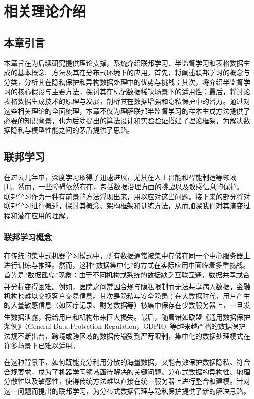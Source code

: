 \chapter{相关理论介绍}
\thispagestyle{others}
\pagestyle{others}
\xiaosi

\section{本章引言}
本章旨在为后续研究提供理论支撑，系统介绍联邦学习、半监督学习和表格数据生成的基本概念、方法及其在分布式环境下的应用。首先，将阐述联邦学习的概念与分类，分析其在隐私保护和异构数据处理中的优势与挑战；其次，将介绍半监督学习的核心假设与主要方法，探讨其在标记数据稀缺场景下的适用性；最后，将讨论表格数据生成技术的原理与发展，剖析其在数据增强和隐私保护中的潜力。通过对这些相关理论的全面梳理，本章不仅为理解联邦半监督学习的样本生成方法提供了必要的知识背景，也为后续提出的算法设计和实验验证搭建了理论框架，为解决数据隐私与模型性能之间的矛盾提供了思路。

\section{联邦学习}
在过去几年中，深度学习取得了迅速进展，尤其在人工智能和智能制造等领域[1]。然而，一些障碍依然存在，包括数据治理方面的挑战以及敏感信息的保护。联邦学习作为一种有前景的方法浮现出来，用以应对这些问题。接下来的部分将对联邦学习进行概述，探讨其概念、架构框架和训练方法，从而加深我们对其演变过程和潜在应用的理解。
\subsection{联邦学习概念}
在传统的集中式机器学习模式中，所有数据通常被集中存储在同一个中心服务器上进行训练与推理。然而，这种“数据集中化”的方式在实际应用中面临着多重挑战。首先是“数据孤岛”现象：由于不同机构或系统的数据缺乏互联互通，数据共享或合并分析变得困难\textsuperscript{\citep{yang2019federated}}。例如，医院之间常因合规与隐私限制而无法共享病人数据，金融机构也难以交换客户交易信息。其次是隐私与安全隐患：在大数据时代，用户产生的大量敏感信息（如医疗记录、财务数据等）被集中保存在少数服务器上，一旦发生数据泄露，将给用户和机构带来巨大损失\textsuperscript{\citep{mcmahan2017communication}}。最后，随着诸如欧盟《通用数据保护条例》（General Data Protection Regulation，GDPR）等越来越严格的数据保护法规不断出台，跨境或跨区域的数据传输受到严苛限制，集中化的数据处理模式在许多场景下已难以适用。

在这种背景下，如何既能充分利用分散的海量数据，又能有效保护数据隐私、符合合规要求，成为了机器学习领域亟待解决的关键问题。分布式数据的异构性、地理分散性以及敏感性，使得传统方法难以直接在统一服务器上进行整合和建模。针对这一问题而提出的联邦学习，为分布式数据管理与隐私保护提供了新的解决思路。

